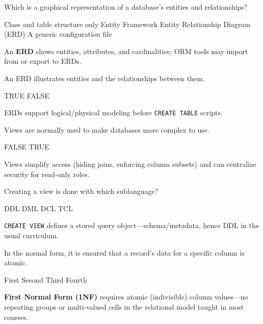 \question[4]
Which is a graphical representation of a database's entities and relationships?
\begin{choices}
  \choice Class and table structure only
  \choice Entity Framework
  \CorrectChoice Entity Relationship Diagram (ERD)
  \choice A generic configuration file
\end{choices}
\begin{solution}
  An \textbf{ERD} shows entities, attributes, and cardinalities; ORM tools may import from or export to ERDs.
\end{solution}

\question[4]
An ERD illustrates entities and the relationships between them.
\begin{choices}
  \CorrectChoice TRUE
  \choice FALSE
\end{choices}
\begin{solution}
  ERDs support logical/physical modeling before \texttt{CREATE TABLE} scripts.
\end{solution}

\question[4]
Views are normally used to make databases more complex to use.
\begin{choices}
  \CorrectChoice FALSE
  \choice TRUE
\end{choices}
\begin{solution}
  Views simplify access (hiding joins, enforcing column subsets) and can centralize security for read-only roles.
\end{solution}

\question[4]
Creating a view is done with which sublanguage?
\begin{choices}
  \CorrectChoice DDL
  \choice DML
  \choice DCL
  \choice TCL
\end{choices}
\begin{solution}
  \lstinline[style=sqlinline]!CREATE VIEW! defines a stored query object---schema/metadata, hence DDL in the usual curriculum.
\end{solution}

\newpage


\question[4]
In the \blank[5em] normal form, it is ensured that a record's data for a specific column is atomic.
\begin{choices}
  \CorrectChoice First
  \choice Second
  \choice Third
  \choice Fourth
\end{choices}
\begin{solution}
  \textbf{First Normal Form (1NF)} requires atomic (indivisible) column values---no repeating groups or multi-valued cells in the relational model taught in most courses.
\end{solution}

